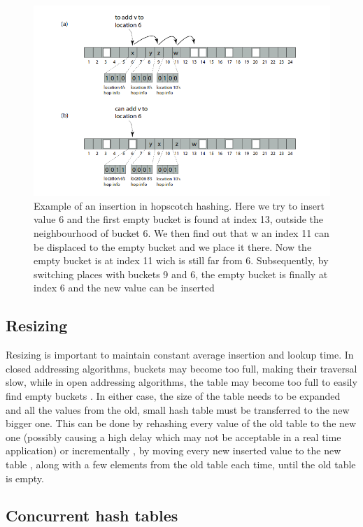 \begin{figure}
 \centering
  \includegraphics[scale=0.5]{hopscotch_hashing.png}
\caption[Example of an insertion in hopscotch hashing]{Example of an insertion in hopscotch hashing. Here we try to insert value 6 and the first empty bucket is found at index 13, outside the neighbourhood of bucket 6. We then find out that w an index 11 can be displaced to the empty bucket and we place it there. Now the empty bucket is at index 11 wich is still far from 6. Subsequently, by switching places with buckets 9 and 6, the empty bucket is finally at index 6 and the new value can be inserted }
\label{fig:hopscotch_hashing}
\end{figure}


\subsection{Resizing}

Resizing is important to maintain constant average insertion and lookup time. In closed addressing algorithms, buckets may become too full, making their traversal slow, while in open addressing algorithms, the table may become too full to easily  find empty buckets . In either case, the size of the table needs to be expanded and all the values from the old, small hash table must be transferred to the new bigger one. This can be done by rehashing every value of the old table to the new one (possibly causing a high delay which may not be acceptable in a real time application) or  incrementally , by moving every new inserted value to the new table , along with a few elements from the old table each time, until the old table is empty.

\subsection{Concurrent hash tables}

